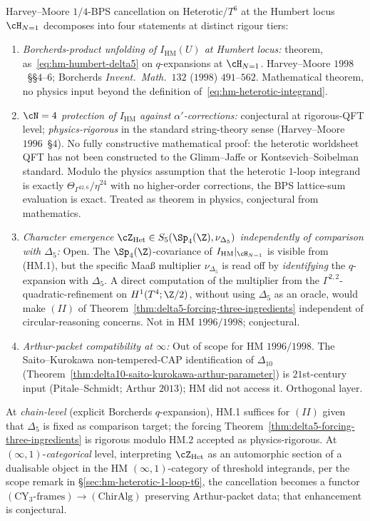\begin{proposition}
\label{prop:hm-cancellation-strata}
Harvey--Moore $1/4$-BPS cancellation on Heterotic/$T^6$ at the
Humbert locus $\cH_{N=1}$ decomposes into four statements at
distinct rigour tiers:
\begin{enumerate}
\item[\textup{(HM.1)}] \emph{Borcherds-product unfolding of
$I_{\mathrm{HM}}(U)$ at Humbert locus:}
theorem, as~\eqref{eq:hm-humbert-delta5} on $q$-expansions at $\cH_{N=1}$.
Harvey--Moore $1998$~\S\S$4$--$6$; Borcherds \emph{Invent.\
Math.}~$132$ ($1998$) $491$--$562$. Mathematical theorem, no
physics input beyond the definition
of~\eqref{eq:hm-heterotic-integrand}.
\item[\textup{(HM.2)}] \emph{$\cN = 4$ protection of
$I_{\mathrm{HM}}$ against $\alpha'$-corrections:}
conjectural at rigorous-QFT level;
\emph{physics-rigorous} in the standard string-theory sense
(Harvey--Moore~$1996$~\S$4$). No fully constructive mathematical
proof: the heterotic worldsheet QFT has not been constructed to
the Glimm--Jaffe or Kontsevich--Soibelman standard. Modulo the
physics assumption that the heterotic $1$-loop integrand is
exactly $\Theta_{\Gamma^{22,6}}/\eta^{24}$ with no higher-order
corrections, the BPS lattice-sum evaluation is exact. Treated as
theorem in physics, conjectural from mathematics.
\item[\textup{(HM.3)}] \emph{Character emergence
$\cZ_{\mathrm{Het}} \in S_5(\Sp_4(\Z), \nu_{\Delta_5})$
independently of comparison with $\Delta_5$:} Open. The
$\Sp_4(\Z)$-covariance of $I_{\mathrm{HM}}|_{\cH_{N=1}}$ is
visible from (HM.1), but the specific Maa{\ss} multiplier
$\nu_{\Delta_5}$ is read off by \emph{identifying} the
$q$-expansion with $\Delta_5$. A direct computation of the
multiplier from the $\Gamma^{2,2}$-quadratic-refinement on
$H^1(T^4;\Z/2)$, without using $\Delta_5$ as an oracle, would
make $(II)$ of
Theorem~\ref{thm:delta5-forcing-three-ingredients}
independent of circular-reasoning concerns. Not in HM $1996/1998$;
conjectural.
\item[\textup{(HM.4)}] \emph{Arthur-packet compatibility at
$\infty$:} Out of scope for HM $1996/1998$. The Saito--Kurokawa
non-tempered-CAP identification of $\Delta_{10}$
(Theorem~\ref{thm:delta10-saito-kurokawa-arthur-parameter}) is
$21$st-century input (Pitale--Schmidt; Arthur $2013$); HM did
not access it. Orthogonal layer.
\end{enumerate}
At \emph{chain-level} (explicit Borcherds $q$-expansion), HM.1
suffices for $(II)$ given that $\Delta_5$ is fixed as comparison
target; the forcing
Theorem~\ref{thm:delta5-forcing-three-ingredients} is
rigorous modulo HM.2 accepted as physics-rigorous. At
$(\infty,1)$-\emph{categorical} level, interpreting
$\cZ_{\mathrm{Het}}$ as an automorphic section of a dualisable
object in the HM $(\infty,1)$-category of threshold integrands,
per the scope remark in \S\ref{sec:hm-heterotic-1-loop-t6}, the
cancellation becomes a functor
$(\mathrm{CY}_3\text{-frames}) \to (\mathrm{ChirAlg})$ preserving
Arthur-packet data; that enhancement is conjectural.
\end{proposition}

